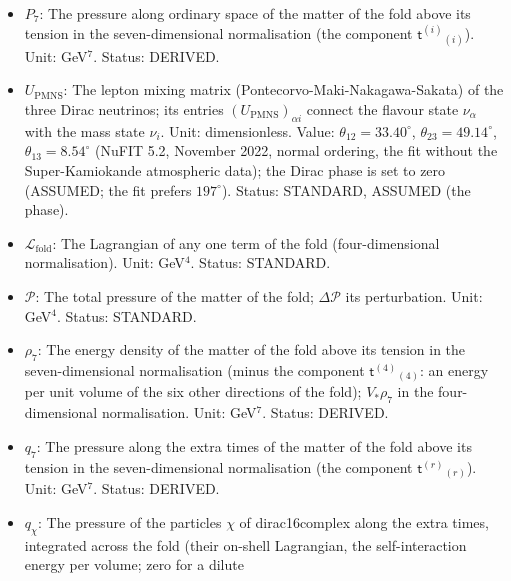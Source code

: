 \documentclass[
  10pt,
]{article}
\begin{document}
\begin{itemize}
  \(F(\upsilon)\): The tunnelling exponent of the width of the particles
  \(\chi\) per unit of \(m_\Psi/H\): the integral of the local decay
  rate \(q\) over the region inside the turning point, divided by
  \(m_\Psi/H\), as a function of the ratio \(\upsilon\) of the energy to
  the bulk mass. Unit: dimensionless. Value: 0.049 for
  \(\upsilon = 0.866\); \((q_{\mathrm{b}}/\omega_{\mathrm{b}})^3/3\) for
  weak binding. Status: DERIVED.
\item
  \(P_7\): The pressure along ordinary space of the matter of the fold
  above its tension in the seven-dimensional normalisation (the
  component \(\mathsf{t}^{(i)}{}_{(i)}\)). Unit: GeV\(^7\). Status:
  DERIVED.
\item
  \(U_{\mathrm{PMNS}}\): The lepton mixing matrix
  (Pontecorvo-Maki-Nakagawa-Sakata) of the three Dirac neutrinos; its
  entries \((U_{\mathrm{PMNS}})_{\alpha i}\) connect the flavour state
  \(\nu_\alpha\) with the mass state \(\nu_i\). Unit: dimensionless.
  Value: \(\theta_{12} = 33.40^\circ\), \(\theta_{23} = 49.14^\circ\),
  \(\theta_{13} = 8.54^\circ\) (NuFIT 5.2, November 2022, normal
  ordering, the fit without the Super-Kamiokande atmospheric data); the
  Dirac phase is set to zero (ASSUMED; the fit prefers \(197^\circ\)).
  Status: STANDARD, ASSUMED (the phase).
\item
  \(\mathcal{L}_{\mathrm{fold}}\): The Lagrangian of any one term of the
  fold (four-dimensional normalisation). Unit: GeV\(^4\). Status:
  STANDARD.
\item
  \(\mathcal{P}\): The total pressure of the matter of the fold;
  \(\Delta\mathcal{P}\) its perturbation. Unit: GeV\(^4\). Status:
  STANDARD.
\item
  \(\rho_7\): The energy density of the matter of the fold above its
  tension in the seven-dimensional normalisation (minus the component
  \(\mathsf{t}^{(4)}{}_{(4)}\): an energy per unit volume of the six
  other directions of the fold); \(V_*\rho_7\) in the four-dimensional
  normalisation. Unit: GeV\(^7\). Status: DERIVED.
\item
  \(q_7\): The pressure along the extra times of the matter of the fold
  above its tension in the seven-dimensional normalisation (the
  component \(\mathsf{t}^{(r)}{}_{(r)}\)). Unit: GeV\(^7\). Status:
  DERIVED.
\item
  \(q_\chi\): The pressure of the particles \(\chi\) of dirac16complex
  along the extra times, integrated across the fold (their on-shell
  Lagrangian, the self-interaction energy per volume; zero for a dilute

\end{itemize}
\end{document}
